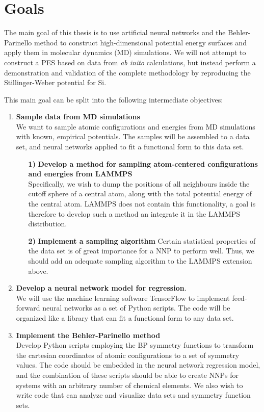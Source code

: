 \documentclass[twoside,english]{uiofysmaster}
\begin{document}
\section{Goals}
The main goal of this thesis is to use artificial neural networks and the Behler-Parinello method to
construct high-dimensional potential energy surfaces and apply them in molecular dynamics (MD) simulations.
We will not attempt to construct a PES based on data from \textit{ab inito} calculations, but instead 
perform a demonstration and validation of the complete methodology by reproducing the Stillinger-Weber potential for Si. 

This main goal can be split into the following intermediate objectives:
\begin{enumerate}[label=\textbf{\alph*)}]
 \item \textbf{Sample data from MD simulations} \\
 We want to sample atomic configurations and energies from MD simulations with known, empirical potentials. 
 The samples will be assembled to a data set, and neural networks applied to fit a functional form to this data set. 
 \begin{enumerate}
 \item[\textbf{1)}] \textbf{Develop a method for sampling atom-centered configurations and energies from LAMMPS} \\
 Specifically, we wish to dump the positions of all neighbours inside the cutoff sphere of a central atom,  
 along with the total potential energy of the central atom. LAMMPS does not contain this functionality, a goal is therefore
 to develop such a method an integrate it in the LAMMPS distribution. 
 \item[\textbf{2)}] \textbf{Implement a sampling algorithm}
 Certain statistical properties of the data set is of great importance for a NNP to perform well. 
 Thus, we should add an adequate sampling algorithm to the LAMMPS extension above. 
 \end{enumerate}

 \item \textbf{Develop a neural network model for regression}. \\
 We will use the machine learning software TensorFlow to implement feed-forward neural networks as a set of Python scripts. 
 The code will be organized like a library that can fit a functional form to any data set. 
 
 \item \textbf{Implement the Behler-Parinello method} \\
 Develop Python scripts employing the BP symmetry functions to transform the cartesian coordinates of atomic configurations 
 to a set of symmetry values. The code should be embedded in the neural network regression model, and the combination of these 
 scripts should be able to create NNPs for systems with an arbitrary number of chemical elements. 
 We also wish to write code that can analyze and visualize data sets and symmetry function sets. 
 

\end{enumerate}
\end{document}
